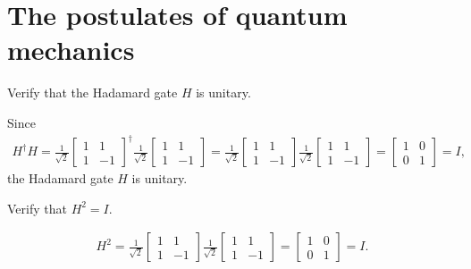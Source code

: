 \documentclass[en]{sol-man}
\begin{document}
\section{The postulates of quantum mechanics}

\begin{exe}
    Verify that the Hadamard gate $H$ is unitary.
\end{exe}
\begin{pf}
    Since
    \begin{align}
        H^{\dagger}H=\frac{1}{\sqrt{2}}\begin{bmatrix}
            1&1\\
            1&-1
        \end{bmatrix}^{\dagger}\frac{1}{\sqrt{2}}\begin{bmatrix}
            1&1\\
            1&-1
        \end{bmatrix}=\frac{1}{\sqrt{2}}\begin{bmatrix}
            1&1\\
            1&-1
        \end{bmatrix}\frac{1}{\sqrt{2}}\begin{bmatrix}
            1&1\\
            1&-1
        \end{bmatrix}=\begin{bmatrix}
            1&0\\
            0&1
        \end{bmatrix}=I,
    \end{align}
    the Hadamard gate $H$ is unitary.
\end{pf}

\begin{exe}
    Verify that $H^2=I$.
\end{exe}
\begin{pf}
    \begin{align}
        H^2=\frac{1}{\sqrt{2}}\begin{bmatrix}
            1&1\\
            1&-1
        \end{bmatrix}\frac{1}{\sqrt{2}}\begin{bmatrix}
            1&1\\
            1&-1
        \end{bmatrix}=\begin{bmatrix}
            1&0\\
            0&1
        \end{bmatrix}=I.
    \end{align}
\end{pf}
\end{document}
